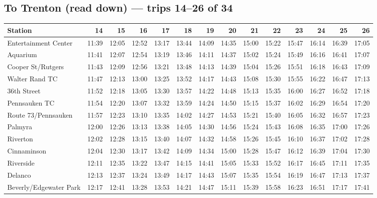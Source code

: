 \subsection*{To Trenton (read down) --- trips 14--26 of 34}
\begin{center}\footnotesize\setlength{\tabcolsep}{3pt}\begin{tabular}{@{}lrrrrrrrrrrrrr@{}}\toprule
Station & 14 & 15 & 16 & 17 & 18 & 19 & 20 & 21 & 22 & 23 & 24 & 25 & 26 \\\midrule
Entertainment Center & 11:39 & 12:05 & 12:52 & 13:17 & 13:44 & 14:09 & 14:35 & 15:00 & 15:22 & 15:47 & 16:14 & 16:39 & 17:05 \\
Aquarium & 11:41 & 12:07 & 12:54 & 13:19 & 13:46 & 14:11 & 14:37 & 15:02 & 15:24 & 15:49 & 16:16 & 16:41 & 17:07 \\
Cooper St/Rutgers & 11:43 & 12:09 & 12:56 & 13:21 & 13:48 & 14:13 & 14:39 & 15:04 & 15:26 & 15:51 & 16:18 & 16:43 & 17:09 \\
Walter Rand TC & 11:47 & 12:13 & 13:00 & 13:25 & 13:52 & 14:17 & 14:43 & 15:08 & 15:30 & 15:55 & 16:22 & 16:47 & 17:13 \\
36th Street & 11:52 & 12:18 & 13:05 & 13:30 & 13:57 & 14:22 & 14:48 & 15:13 & 15:35 & 16:00 & 16:27 & 16:52 & 17:18 \\
Pennsauken TC & 11:54 & 12:20 & 13:07 & 13:32 & 13:59 & 14:24 & 14:50 & 15:15 & 15:37 & 16:02 & 16:29 & 16:54 & 17:20 \\
Route 73/Pennsauken & 11:57 & 12:23 & 13:10 & 13:35 & 14:02 & 14:27 & 14:53 & 15:21 & 15:40 & 16:05 & 16:32 & 16:57 & 17:23 \\
Palmyra & 12:00 & 12:26 & 13:13 & 13:38 & 14:05 & 14:30 & 14:56 & 15:24 & 15:43 & 16:08 & 16:35 & 17:00 & 17:26 \\
Riverton & 12:02 & 12:28 & 13:15 & 13:40 & 14:07 & 14:32 & 14:58 & 15:26 & 15:45 & 16:10 & 16:37 & 17:02 & 17:28 \\
Cinnaminson & 12:04 & 12:30 & 13:17 & 13:42 & 14:09 & 14:34 & 15:00 & 15:28 & 15:47 & 16:12 & 16:39 & 17:04 & 17:30 \\
Riverside & 12:11 & 12:35 & 13:22 & 13:47 & 14:15 & 14:41 & 15:05 & 15:33 & 15:52 & 16:17 & 16:45 & 17:11 & 17:35 \\
Delanco & 12:13 & 12:37 & 13:24 & 13:49 & 14:17 & 14:43 & 15:07 & 15:35 & 15:54 & 16:19 & 16:47 & 17:13 & 17:37 \\
Beverly/Edgewater Park & 12:17 & 12:41 & 13:28 & 13:53 & 14:21 & 14:47 & 15:11 & 15:39 & 15:58 & 16:23 & 16:51 & 17:17 & 17:41 \\

\end{tabular}
\end{center}

